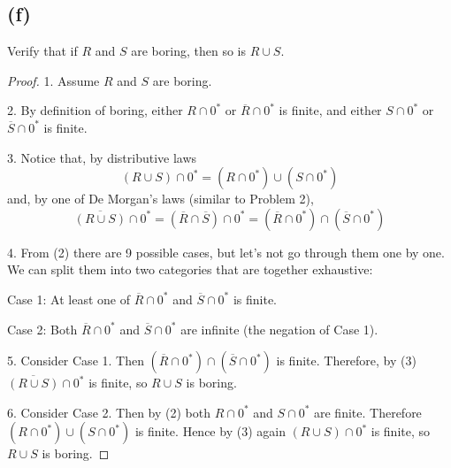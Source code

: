 \documentclass[14pt]{extarticle}
\begin{document}
\subsection{(f)}
Verify that if $R$ and $S$ are boring, then so is $R \cup S$.
\begin{proof}
1. Assume $R$ and $S$ are boring.

2. By definition of boring, either $R \cap 0^*$ or $\overline{R} \cap 0^*$ is finite, and either $S \cap 0^*$ or $\overline{S} \cap 0^*$ is finite.

3. Notice that, by distributive laws
$$
(R \cup S) \cap 0^* = (R \cap 0^*) \cup (S \cap 0^*)
$$
and, by one of De Morgan's laws (similar to Problem 2),
$$
\overline{(R \cup S)} \cap 0^* = (\overline{R} \cap \overline{S}) \cap 0^* = (\overline{R} \cap 0^*) \cap (\overline{S} \cap 0^*)
$$

4. From (2) there are 9 possible cases, but let's not go through them one by one. We can split them into two categories that are together exhaustive:

Case 1: At least one of $\overline{R} \cap 0^*$ and $\overline{S} \cap 0^*$ is finite.

Case 2: Both $\overline{R} \cap 0^*$ and $\overline{S} \cap 0^*$ are infinite (the negation of Case 1).

5. Consider Case 1. Then $(\overline{R} \cap 0^*) \cap (\overline{S} \cap 0^*)$ is finite. Therefore, by (3) $\overline{(R \cup S)} \cap 0^*$ is finite, so $R \cup S$ is boring.

6. Consider Case 2. Then by (2) both $R \cap 0^*$ and $S \cap 0^*$ are finite. Therefore $(R \cap 0^*) \cup (S \cap 0^*)$ is finite. Hence by (3) again $(R \cup S) \cap 0^*$ is finite, so $R \cup S$ is boring.
\end{proof}
\end{document}
